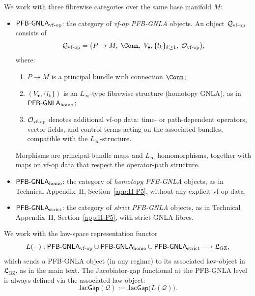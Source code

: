 \documentclass[11pt]{book}
\theoremstyle{plain}
\theoremstyle{definition}
\newcommand{\GZLS}{\ensuremath{\mathfrak{L}_{\mathrm{GZ}}}}       \newcommand{\GZLT}{\ensuremath{M_{!w}}}                           \newcommand{\GZLOC}{\ensuremath{A_M}}                             \newcommand{\GZLCurv}{\ensuremath{\mathcal{F}_{\mathrm{law}}}}
\begin{document}
We work with three fibrewise categories over the same base manifold
\(M\):

\begin{itemize}
  \item \(\mathsf{PFB\text- GNLA}_{\mathrm{vf\text- op}}\): the
        category of \emph{vf-op PFB-GNLA} objects.  An object
        \(\mathcal{Q}_{\mathrm{vf\text- op}}\) consists of
        \[
          \mathcal{Q}_{\mathrm{vf\text- op}}
          =
          \bigl(P\to M,\;
                \Conn,\;
                V_\bullet,\{l_k\}_{k\ge 1},\;
                \mathcal{O}_{\mathrm{vf\text- op}}\bigr),
        \]
        where:
        \begin{enumerate}
          \item \(P\to M\) is a principal bundle with connection
                \(\Conn\);
          \item \((V_\bullet,\{l_k\})\) is an \(L_\infty\)-type
                fibrewise structure (homotopy GNLA), as in
                \(\mathsf{PFB\text- GNLA}_{\mathrm{homo}}\);
          \item \(\mathcal{O}_{\mathrm{vf\text- op}}\) denotes
                additional vf-op data: time- or path-dependent
                operators, vector fields, and control terms acting on
                the associated bundles, compatible with the
                \(L_\infty\)-structure.
        \end{enumerate}
        Morphisms are principal-bundle maps and \(L_\infty\)
        homomorphisms, together with maps on vf-op data that respect
        the operator-path structure.
  \item \(\mathsf{PFB\text- GNLA}_{\mathrm{homo}}\): the category of
        \emph{homotopy PFB-GNLA} objects, as in
        Technical Appendix~II, Section~\ref{app:II-P5}, without any
        explicit vf-op data.
  \item \(\mathsf{PFB\text- GNLA}_{\mathrm{strict}}\): the category of
        \emph{strict PFB-GNLA} objects, as in
        Technical Appendix~II, Section~\ref{app:II-P5}, with strict GNLA
        fibres.
\end{itemize}

We work with the law-space representation functor
\[
  L(-) : \mathsf{PFB\text- GNLA}_{\mathrm{vf\text- op}}
  \cup
  \mathsf{PFB\text- GNLA}_{\mathrm{homo}}
  \cup
  \mathsf{PFB\text- GNLA}_{\mathrm{strict}}
  \longrightarrow
  \GZLS,
\]
which sends a PFB-GNLA object (in any regime) to its associated
law-object in \(\GZLS\), as in the main text.  The Jacobiator-gap
functional at the PFB-GNLA level is always defined via the associated
law-object:
\[
  \mathsf{JacGap}(\mathcal{Q})
  :=
  \mathsf{JacGap}\bigl(L(\mathcal{Q})\bigr).
\]
\end{document}
